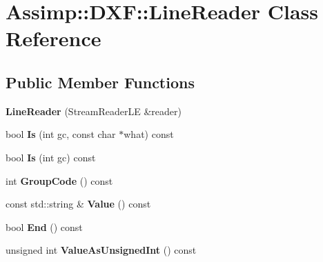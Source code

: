 \hypertarget{class_assimp_1_1_d_x_f_1_1_line_reader}{\section{Assimp\+:\+:D\+X\+F\+:\+:Line\+Reader Class Reference}
\label{class_assimp_1_1_d_x_f_1_1_line_reader}
}
\subsection*{Public Member Functions}
\begin{DoxyCompactItemize}
\item 
\hypertarget{class_assimp_1_1_d_x_f_1_1_line_reader_a22a11ca68aba4b1cf2995ad6eb17bade}{{\bfseries Line\+Reader} (Stream\+Reader\+L\+E \&reader)}\label{class_assimp_1_1_d_x_f_1_1_line_reader_a22a11ca68aba4b1cf2995ad6eb17bade}

\item 
\hypertarget{class_assimp_1_1_d_x_f_1_1_line_reader_a648213c525f81b06bb92587f48307627}{bool {\bfseries Is} (int gc, const char $\ast$what) const }\label{class_assimp_1_1_d_x_f_1_1_line_reader_a648213c525f81b06bb92587f48307627}

\item 
\hypertarget{class_assimp_1_1_d_x_f_1_1_line_reader_ae1011f3c0b01d8bd9b372dfb63cb2712}{bool {\bfseries Is} (int gc) const }\label{class_assimp_1_1_d_x_f_1_1_line_reader_ae1011f3c0b01d8bd9b372dfb63cb2712}

\item 
\hypertarget{class_assimp_1_1_d_x_f_1_1_line_reader_ac7ea52ab69453222128d52983050507e}{int {\bfseries Group\+Code} () const }\label{class_assimp_1_1_d_x_f_1_1_line_reader_ac7ea52ab69453222128d52983050507e}

\item 
\hypertarget{class_assimp_1_1_d_x_f_1_1_line_reader_a06773468321943bfceb2018183c03745}{const std\+::string \& {\bfseries Value} () const }\label{class_assimp_1_1_d_x_f_1_1_line_reader_a06773468321943bfceb2018183c03745}

\item 
\hypertarget{class_assimp_1_1_d_x_f_1_1_line_reader_a69b753938f836cc0a43ccdee5f556139}{bool {\bfseries End} () const }\label{class_assimp_1_1_d_x_f_1_1_line_reader_a69b753938f836cc0a43ccdee5f556139}

\item 
\hypertarget{class_assimp_1_1_d_x_f_1_1_line_reader_a5a11eecc188793f85deaba27624c5a1a}{unsigned int {\bfseries Value\+As\+Unsigned\+Int} () const }\label{class_assimp_1_1_d_x_f_1_1_line_reader_a5a11eecc188793f85deaba27624c5a1a}


\end{DoxyCompactItemize}
